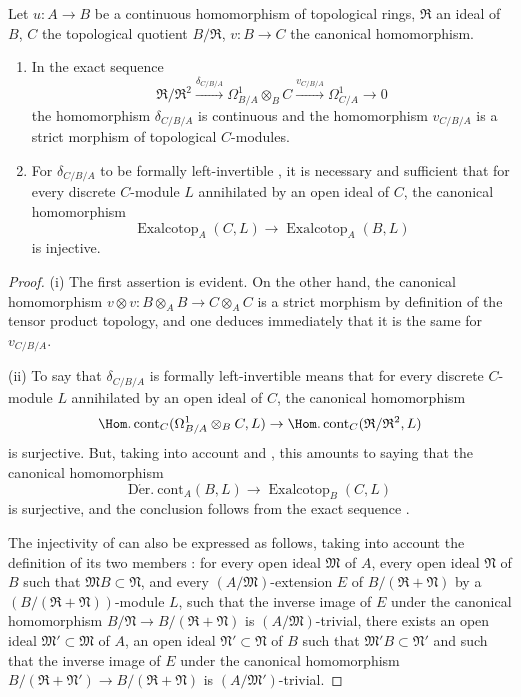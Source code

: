 \begin{proposition}[20.7.8]
\label{0.20.7.8}
Let $u:A\to B$ be a continuous homomorphism of topological rings, $\mathfrak{R}$ an ideal of $B$, $C$ the topological quotient $B/\mathfrak{R}$, $v:B\to C$ the canonical homomorphism.
\begin{enumerate}
  \item[\rm(i)] In the exact sequence 
\[
  \mathfrak{R}/\mathfrak{R}^2\xrightarrow{\delta_{C/B/A}}\Omega^1_{B/A}\otimes_B C\xrightarrow{v_{C/B/A}}\Omega^1_{C/A}\to 0
\]
the homomorphism $\delta_{C/B/A}$ is continuous and the homomorphism $v_{C/B/A}$ is a strict morphism of topological $C$-modules.
  \item[\rm(ii)] For $\delta_{C/B/A}$ to be formally left-invertible , it is necessary and sufficient that for every discrete $C$-module $L$ annihilated by an open ideal of $C$, the canonical homomorphism
\begin{equation}
\tag{20.7.8.1}
  \label{0.20.7.8.1}
  \operatorname{Exalcotop}_A(C,L)\to\operatorname{Exalcotop}_A(B,L)
\end{equation}
is injective.
\end{enumerate}
\end{proposition}

\begin{proof}
(i) The first assertion is evident.
On the other hand, the canonical homomorphism $v\otimes v:B\otimes_A B\to C\otimes_A C$ is a strict morphism by definition of the tensor product topology, and one deduces immediately that it is the same for $v_{C/B/A}$.

(ii) To say that $\delta_{C/B/A}$ is formally left-invertible means that for every discrete $C$-module $L$ annihilated by an open ideal of $C$, the canonical homomorphism
\[
  \Hom.\operatorname{cont}_C(\Omega^1_{B/A}\otimes_B C,L)\to\Hom.\operatorname{cont}_C(\mathfrak{R}/\mathfrak{R}^2,L)
\]
is surjective.
But, taking into account  and , this amounts to saying that the canonical homomorphism
\[
  \operatorname{D\acute{e}r.\ cont}_A(B,L)\to\operatorname{Exalcotop}_B(C,L)
\]
is surjective, and the conclusion follows from the exact sequence .

The injectivity of  can also be expressed as follows, taking into account the definition of its two members : for every open ideal $\mathfrak{M}$ of $A$, every open ideal $\mathfrak{N}$ of $B$ such that $\mathfrak{M}B\subset\mathfrak{N}$, and every $(A/\mathfrak{M})$-extension $E$ of $B/(\mathfrak{R}+\mathfrak{N})$ by a $(B/(\mathfrak{R}+\mathfrak{N}))$-module $L$, such that the inverse image of $E$ under the canonical homomorphism $B/\mathfrak{N}\to B/(\mathfrak{R}+\mathfrak{N})$ is $(A/\mathfrak{M})$-trivial, there exists an open ideal $\mathfrak{M}'\subset\mathfrak{M}$ of $A$,
an open ideal $\mathfrak{N}'\subset\mathfrak{N}$ of $B$ such that $\mathfrak{M}'B\subset\mathfrak{N}'$ and such that the inverse image of $E$ under the canonical homomorphism $B/(\mathfrak{R}+\mathfrak{N}')\to B/(\mathfrak{R}+\mathfrak{N})$ is $(A/\mathfrak{M}')$-trivial.
\end{proof}

